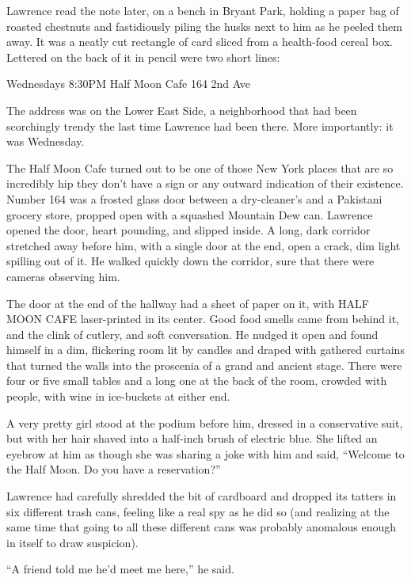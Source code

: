 Lawrence read the note later, on a bench in Bryant Park, holding a 
paper bag of roasted chestnuts and fastidiously piling the husks next 
to him as he peeled them away. It was a neatly cut rectangle of card 
sliced from a health-food cereal box. Lettered on the back of it in 
pencil were two short lines:

Wednesdays 8:30PM Half Moon Cafe 164 2nd Ave

The address was on the Lower East Side, a neighborhood that had been 
scorchingly trendy the last time Lawrence had been there. More 
importantly: it was Wednesday.

\tb

The Half Moon Cafe turned out to be one of those New York places that 
are so incredibly hip they don't have a sign or any outward indication 
of their existence. Number 164 was a frosted glass door between a 
dry-cleaner's and a Pakistani grocery store, propped open with a 
squashed Mountain Dew can. Lawrence opened the door, heart pounding, 
and slipped inside. A long, dark corridor stretched away before him, 
with a single door at the end, open a crack, dim light spilling out of 
it. He walked quickly down the corridor, sure that there were cameras 
observing him.

The door at the end of the hallway had a sheet of paper on it, with 
HALF MOON CAFE laser-printed in its center. Good food smells came from 
behind it, and the clink of cutlery, and soft conversation. He nudged 
it open and found himself in a dim, flickering room lit by candles and 
draped with gathered curtains that turned the walls into the proscenia 
of a grand and ancient stage. There were four or five small tables and 
a long one at the back of the room, crowded with people, with wine in 
ice-buckets at either end.

A very pretty girl stood at the podium before him, dressed in a 
conservative suit, but with her hair shaved into a half-inch brush of 
electric blue. She lifted an eyebrow at him as though she was sharing a 
joke with him and said, “Welcome to the Half Moon. Do you have a 
reservation?”

Lawrence had carefully shredded the bit of cardboard and dropped its 
tatters in six different trash cans, feeling like a real spy as he did 
so (and realizing at the same time that going to all these different 
cans was probably anomalous enough in itself to draw suspicion).

“A friend told me he'd meet me here,” he said.

